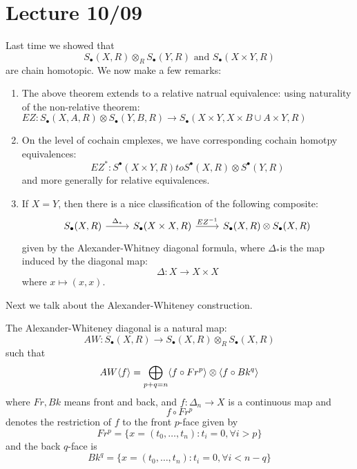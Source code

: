 \section{Lecture 10/09}

Last time we showed that 
\begin{equation*}
    S_\bullet(X,R)\otimes_R S_\bullet(Y,R) \text{ and } S_\bullet(X\times Y,R)
\end{equation*}
are chain homotopic. We now make a few remarks:
\begin{enumerate}
    \item The above theorem extends to a relative natrual equivalence: using naturality of the non-relative theorem: $EZ: S_\bullet(X,A,R)\otimes S_\bullet(Y,B,R)\to S_\bullet(X\times Y, X\times B\cup A\times Y, R)$
    \item On the level of cochain cmplexes, we have corresponding cochain homotpy equivalences: 
    \begin{equation*}
        EZ^*: S^\bullet(X\times Y, R)to S^\bullet(X,R)\otimes S^\bullet(Y,R)
    \end{equation*}
    and more generally for relative equivalences.
    \item If $X=Y$, then there is a nice classification of the following composite:
    \[\begin{tikzcd}
        {S_\bullet(X,R)} & {S_\bullet(X\times X,R)} & {S_\bullet(X,R)\otimes S_\bullet(X,R)}
        \arrow["{\Delta_*}", from=1-1, to=1-2]
        \arrow["{EZ^{-1}}", from=1-2, to=1-3]
    \end{tikzcd}\]
    given by the Alexander-Whitney diagonal formula, where $\Delta_*$is the map induced by the diagonal map:
    \begin{equation*}
        \Delta:X\to X\times X
    \end{equation*}
    where $x\mapsto (x,x)$.
\end{enumerate}
Next we talk about the Alexander-Whiteney construction.
\begin{defn}
    The Alexander-Whiteney diagonal is a natural map:
    \begin{equation*}
        AW: S_\bullet(X,R)\to S_\bullet(X,R)\otimes_R S_\bullet(X,R)
    \end{equation*}
    such that 
    \begin{equation*}
        AW\langle f\rangle=\bigoplus_{p+q=n}\langle f\circ Fr^p\rangle\otimes \langle f\circ Bk^q\rangle
    \end{equation*}
    where $Fr,Bk$ means front and back, and $f:\Delta_n\to X$ is a continuous map and 
    \begin{equation*}
        f\circ Fr^p
    \end{equation*}
    denotes the restriction of $f$ to the front $p$-face given by 
    \begin{equation*}
        Fr^p=\{x=(t_0,\dots, t_n):t_i=0, \forall i>p\}
    \end{equation*}
    and the back $q$-face is 
    \begin{equation*}
        Bk^q=\{x=(t_0,\dots, t_n): t_i=0, \forall i<n-q\}
    \end{equation*}
\end{defn}
